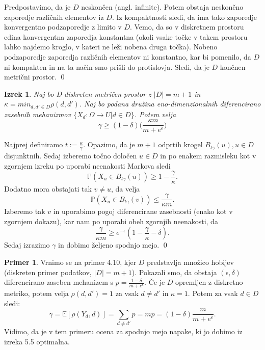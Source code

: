 \documentclass[12pt,a4paper]{amsart}
\theoremstyle{definition} %
\newtheorem{primer}[definicija]{Primer}
\theoremstyle{plain} %
\newtheorem{izrek}[definicija]{Izrek}
\begin{document}
\proof
 Predpostavimo, da je $D$ neskončen (angl. infinite). Potem obstaja neskončno zaporedje različnih elementov iz $D$. Iz kompaktnosti sledi, da ima tako zaporedje konvergentno podzaporedje z limito v $D$. Vemo, da so v diskretnem prostoru edina konvergentna zaporedja konstantna (okoli vsake točke v takem prostoru lahko najdemo kroglo, v kateri ne leži nobena druga točka). Nobeno podzaporedje zaporedja različnih elementov ni konstantno, kar bi pomenilo, da $D$ ni kompakten in na ta način smo prišli do protislovja. Sledi, da je $D$ končnen metrični prostor.
\qed
\newline
\newline
\begin{izrek}
Naj bo D diskreten metričen prostor z $|D| = m + 1$ in $\kappa = min_{d,d' \in D}\rho(d,d')$.  Naj bo podana družina eno-dimenzionalnih diferencirano zasebnih mehanizmov $\{ X_d: \Omega \rightarrow U | d \in D\}$. Potem velja $$\gamma  \geq (1-\delta)\Big(\frac{\kappa m}{m+e^\epsilon}\Big)$$
\end{izrek}
\proof
Najprej definiramo $t := \frac{\kappa}{\gamma}$. Opazimo, da je $m + 1$ odprtih krogel $B_{t\gamma}(u), u \in D$ disjunktnih. Sedaj izberemo točno določen $u \in D$ in po enakem razmisleku kot v zgornjem izreku po uporabi neenakosti Markova sledi $$\mathbb{P}(X_u \in B_{t\gamma}(u)) \geq 1 - \frac{\gamma}{\kappa}.$$
Dodatno mora obstajati tak $v \neq u$, da velja $$\mathbb{P}(X_u \in B_{t\gamma}(v)) \leq \frac{\gamma}{\kappa m}.$$  Izberemo tak $v$ in uporabimo pogoj diferencirane zasebnosti (enako kot v zgornjem dokazu), kar nam po uporabi obeh zgornjih neenakosti, da $$\frac{\gamma}{\kappa m} \geq e^{-\epsilon}(1 - \frac{\gamma}{\kappa} - \delta). $$ Sedaj izrazimo $\gamma$ in dobimo željeno spodnjo mejo.
\qed
\begin{primer}
Vrnimo se na primer 4.10, kjer $D$ predstavlja množico hobijev (diskreten primer podatkov, $|D|=m+1$). Pokazali smo, da obstaja $(\epsilon, \delta)$ diferencirano zaseben mehanizem s $p=\frac{1-\delta}{m+e^{\epsilon}}$. Če je $D$ opremljen z diskretno metriko, potem velja $\rho(d,d')=1$ za vsak $d \neq d'$ in $\kappa=1$. Potem za vsak $d \in D$ sledi:
$$\gamma = \mathbb{E}[\rho(Y_d,d)] = \sum_{d \neq d'}p=mp=(1-\delta)\frac{m}{m+e^{\epsilon}}.$$ Vidimo, da je v tem primeru ocena za spodnjo mejo napake, ki jo dobimo iz izreka 5.5 optimalna.
\end{primer}
\end{document}

